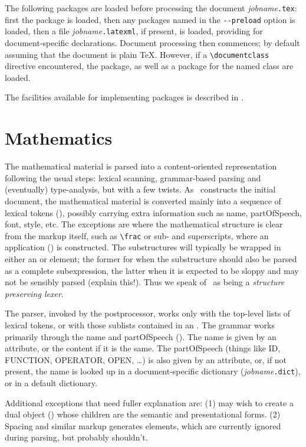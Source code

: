 \documentclass{article}
\begin{document}
The following packages are loaded before processing the document \textit{jobname}\texttt{.tex}:
first the  package is loaded, then any packages named in
the \verb|--preload| option is loaded, then a file \textit{jobname}\texttt{.latexml}, if 
present, is loaded, providing for document-specific declarations.
Document processing then commences; by default assuming that the document is plain \TeX.
However, if a \verb|\documentclass| directive encountered, the  package, as well
as a package for the named class are loaded.

The facilities available for implementing packages is described in .

\section{Mathematics}\label{sec:math}
The mathematical material is parsed into a content-oriented representation following
the usual steps: lexical scanning, grammar-based parsing and (eventually) type-analysis, but
with a few twists. As \LaTeXML\ constructs the initial document, the mathematical material
is converted mainly into a sequence of lexical tokens (), possibly carrying extra information
such as name, partOfSpeech, font, style, etc.  The exceptions are where 
the mathematical structure is clear from the markup itself, such as \verb|\frac| or sub- and
superscripts, where an application () is constructed.  The substructures will 
typically be wrapped in either an  or  element; the former for when 
the substructure should also be parsed as a complete subexpression, the latter when it is 
expected to be sloppy and may not be sensibly parsed (explain this!).
Thus we speak of \LaTeXML\ as being a \emph{structure preserving lexer}.  

The parser, invoked by the postprocessor, works only with the top-level lists of lexical tokens,
or with those sublists contained in an .  The grammar works primarily through
the name and partOfSpeech ().  The name is given by an attribute, or the content if it is
the same.  The partOfSpeech (things like ID, FUNCTION, OPERATOR, OPEN, \ldots) is also given
by an attribute, or, if not present, the name is looked up in a document-specific
dictionary (\textit{jobname}\texttt{.dict}), or in a default dictionary.

Additional exceptions that need fuller explanation are: 
(1)  may wish to create a dual object () whose children are 
the semantic and presentational forms.
(2) Spacing and similar markup generates  elements, which are currently ignored
during parsing, but probably shouldn't.
\end{document}
